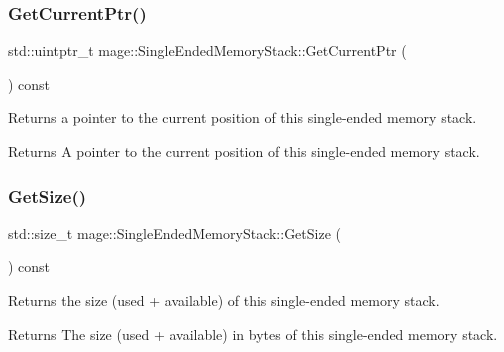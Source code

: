 \subsubsection{\texorpdfstring{Get\+Current\+Ptr()}{GetCurrentPtr()}}
{\footnotesize\ttfamily std\+::uintptr\+\_\+t mage\+::\+Single\+Ended\+Memory\+Stack\+::\+Get\+Current\+Ptr (\begin{DoxyParamCaption}{ }\end{DoxyParamCaption}) const\hspace{0.3cm}{\ttfamily [noexcept]}}

Returns a pointer to the current position of this single-\/ended memory stack.

\begin{DoxyReturn}{Returns}
A pointer to the current position of this single-\/ended memory stack. 
\end{DoxyReturn}
\mbox{\label{classmage_1_1_single_ended_memory_stack_a622a91fa2386f37d92ad915941930326}} 
\subsubsection{\texorpdfstring{Get\+Size()}{GetSize()}}
{\footnotesize\ttfamily std\+::size\+\_\+t mage\+::\+Single\+Ended\+Memory\+Stack\+::\+Get\+Size (\begin{DoxyParamCaption}{ }\end{DoxyParamCaption}) const\hspace{0.3cm}{\ttfamily [noexcept]}}

Returns the size (used + available) of this single-\/ended memory stack.

\begin{DoxyReturn}{Returns}
The size (used + available) in bytes of this single-\/ended memory stack. 
\end{DoxyReturn}
\mbox{\label{classmage_1_1_single_ended_memory_stack_acdc7e767f8306b2e073d438bcb54e54b}} 
